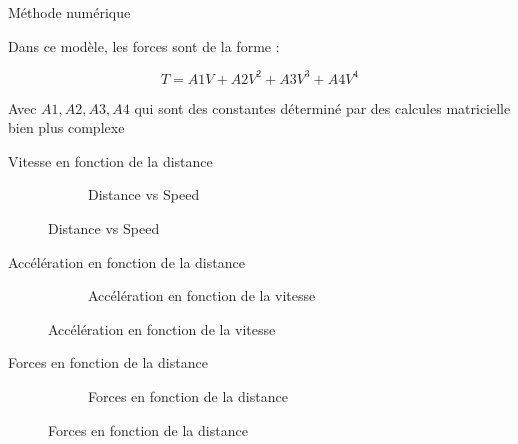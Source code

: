 			
			\begin{frame}{Méthode numérique}
				
				Dans ce modèle, les forces sont de la forme :
				
			\[			T = A1  V + A2 V^2 + A3 V^3 +A4 V^4	\]
			
			Avec $A1, A2, A3, A4 $ qui sont des constantes déterminé par des calcules matricielle bien plus complexe 
				
			\end{frame}
			
			\begin{frame}{Vitesse en fonction de la distance}
				
				\begin{figure}
					\centering
					
					\begin{subfigure}{0.45\textwidth}
						\centering
						\caption{Distance vs Speed}
					\end{subfigure}
					
				\end{figure}
				
			\end{frame}
			
			
			\begin{frame}{Accélération en fonction de la distance}
				
				\begin{figure}
					\centering
					
					\begin{subfigure}{0.45\textwidth}
						\centering
						\caption{Accélération en fonction de la vitesse}
					\end{subfigure}
					
				\end{figure}
				
			\end{frame}
			
			\begin{frame}{Forces en fonction de la distance}
				
				\begin{figure}
					\centering
					
					\begin{subfigure}{0.45\textwidth}
						\centering
						\caption{Forces en fonction de la distance}
					\end{subfigure}
					
				\end{figure}
				
			\end{frame}
				
